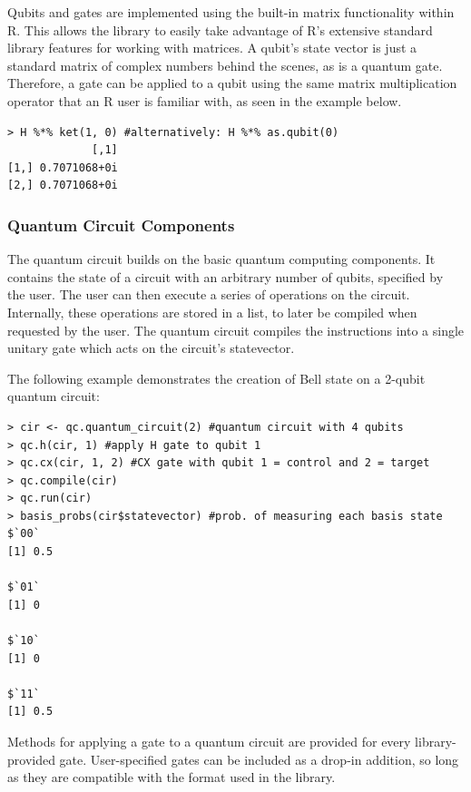 \documentclass{article}
\begin{document}
Qubits and gates are implemented using the built-in matrix functionality within R. This allows the library to easily take advantage of R's extensive standard library features for working with matrices. A qubit's state vector is just a standard matrix of complex numbers behind the scenes, as is a quantum gate. Therefore, a gate can be applied to a qubit using the same matrix multiplication operator that an R user is familiar with, as seen in the example below.

\vspace{1em}

\begin{lstlisting}[caption={Applying a Hadamard gate to $\ket{0}$}]
> H %*% ket(1, 0) #alternatively: H %*% as.qubit(0)
             [,1]
[1,] 0.7071068+0i
[2,] 0.7071068+0i
\end{lstlisting}

\subsubsection{Quantum Circuit Components}
The quantum circuit builds on the basic quantum computing components. It contains the state of a circuit with an arbitrary number of qubits, specified by the user. The user can then execute a series of operations on the circuit. Internally, these operations are stored in a list, to later be compiled when requested by the user. The quantum circuit compiles the instructions into a single unitary gate which acts on the circuit's statevector.

The following example demonstrates the creation of Bell state on a 2-qubit quantum circuit:

\begin{lstlisting}[caption={Bell state on a 2-qubit quantum circuit}]
> cir <- qc.quantum_circuit(2) #quantum circuit with 4 qubits
> qc.h(cir, 1) #apply H gate to qubit 1
> qc.cx(cir, 1, 2) #CX gate with qubit 1 = control and 2 = target
> qc.compile(cir)
> qc.run(cir)
> basis_probs(cir$statevector) #prob. of measuring each basis state
$`00`
[1] 0.5

$`01`
[1] 0

$`10`
[1] 0

$`11`
[1] 0.5
\end{lstlisting}

Methods for applying a gate to a quantum circuit are provided for every library-provided gate. User-specified gates can be included as a drop-in addition, so long as they are compatible with the format used in the library.
\end{document}
